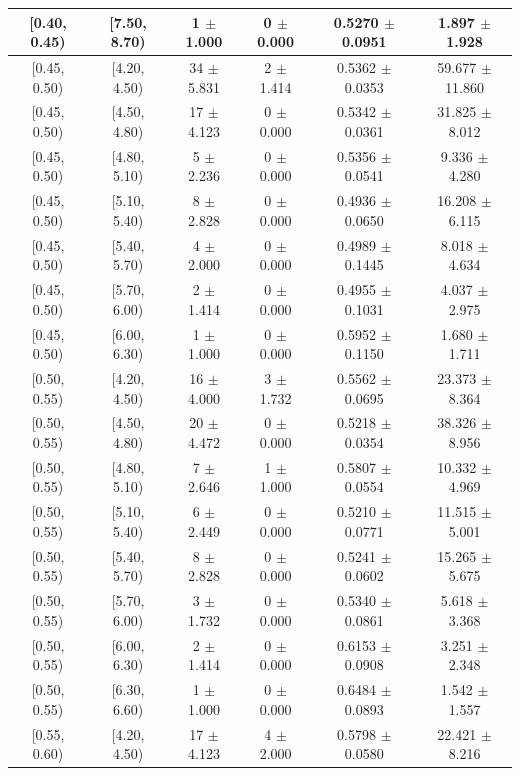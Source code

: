 \begin{longtable}{|c|c|c|c|c|c|}
\hline
[0.40, 0.45) & [7.50, 8.70) & 1 $\pm$ 1.000 & 0 $\pm$ 0.000 & 0.5270 $\pm$ 0.0951 & 1.897 $\pm$ 1.928 \\ 
\hline
[0.45, 0.50) & [4.20, 4.50) & 34 $\pm$ 5.831 & 2 $\pm$ 1.414 & 0.5362 $\pm$ 0.0353 & 59.677 $\pm$ 11.860 \\ 
\hline
[0.45, 0.50) & [4.50, 4.80) & 17 $\pm$ 4.123 & 0 $\pm$ 0.000 & 0.5342 $\pm$ 0.0361 & 31.825 $\pm$ 8.012 \\ 
\hline
[0.45, 0.50) & [4.80, 5.10) & 5 $\pm$ 2.236 & 0 $\pm$ 0.000 & 0.5356 $\pm$ 0.0541 & 9.336 $\pm$ 4.280 \\ 
\hline
[0.45, 0.50) & [5.10, 5.40) & 8 $\pm$ 2.828 & 0 $\pm$ 0.000 & 0.4936 $\pm$ 0.0650 & 16.208 $\pm$ 6.115 \\ 
\hline
[0.45, 0.50) & [5.40, 5.70) & 4 $\pm$ 2.000 & 0 $\pm$ 0.000 & 0.4989 $\pm$ 0.1445 & 8.018 $\pm$ 4.634 \\ 
\hline
[0.45, 0.50) & [5.70, 6.00) & 2 $\pm$ 1.414 & 0 $\pm$ 0.000 & 0.4955 $\pm$ 0.1031 & 4.037 $\pm$ 2.975 \\ 
\hline
[0.45, 0.50) & [6.00, 6.30) & 1 $\pm$ 1.000 & 0 $\pm$ 0.000 & 0.5952 $\pm$ 0.1150 & 1.680 $\pm$ 1.711 \\ 
\hline
[0.50, 0.55) & [4.20, 4.50) & 16 $\pm$ 4.000 & 3 $\pm$ 1.732 & 0.5562 $\pm$ 0.0695 & 23.373 $\pm$ 8.364 \\ 
\hline
[0.50, 0.55) & [4.50, 4.80) & 20 $\pm$ 4.472 & 0 $\pm$ 0.000 & 0.5218 $\pm$ 0.0354 & 38.326 $\pm$ 8.956 \\ 
\hline
[0.50, 0.55) & [4.80, 5.10) & 7 $\pm$ 2.646 & 1 $\pm$ 1.000 & 0.5807 $\pm$ 0.0554 & 10.332 $\pm$ 4.969 \\ 
\hline
[0.50, 0.55) & [5.10, 5.40) & 6 $\pm$ 2.449 & 0 $\pm$ 0.000 & 0.5210 $\pm$ 0.0771 & 11.515 $\pm$ 5.001 \\ 
\hline
[0.50, 0.55) & [5.40, 5.70) & 8 $\pm$ 2.828 & 0 $\pm$ 0.000 & 0.5241 $\pm$ 0.0602 & 15.265 $\pm$ 5.675 \\ 
\hline
[0.50, 0.55) & [5.70, 6.00) & 3 $\pm$ 1.732 & 0 $\pm$ 0.000 & 0.5340 $\pm$ 0.0861 & 5.618 $\pm$ 3.368 \\ 
\hline
[0.50, 0.55) & [6.00, 6.30) & 2 $\pm$ 1.414 & 0 $\pm$ 0.000 & 0.6153 $\pm$ 0.0908 & 3.251 $\pm$ 2.348 \\ 
\hline
[0.50, 0.55) & [6.30, 6.60) & 1 $\pm$ 1.000 & 0 $\pm$ 0.000 & 0.6484 $\pm$ 0.0893 & 1.542 $\pm$ 1.557 \\ 
\hline
[0.55, 0.60) & [4.20, 4.50) & 17 $\pm$ 4.123 & 4 $\pm$ 2.000 & 0.5798 $\pm$ 0.0580 & 22.421 $\pm$ 8.216 \\ 

\end{longtable}
